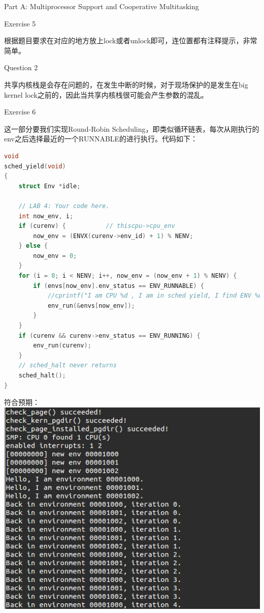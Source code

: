 \documentclass[GBK,winfonts,a4paper,10pt]{ctexart}
\begin{document}
\begin{section}{Part A: Multiprocessor Support and Cooperative Multitasking}
\begin{subsection}{Exercise 5}
\par
根据题目要求在对应的地方放上lock或者unlock即可，连位置都有注释提示，非常简单。
\end{subsection}

\begin{subsection}{Question 2}
\par
共享内核栈是会存在问题的，在发生中断的时候，对于现场保护的是发生在big kernel lock之前的，因此当共享内核栈很可能会产生参数的混乱。
\end{subsection}

\begin{subsection}{Exercise 6}
\par
这一部分要我们实现Round-Robin Scheduling，即类似循环链表，每次从刚执行的env之后选择最近的一个RUNNABLE的进行执行。代码如下：
\begin{lstlisting}[language=C]
void
sched_yield(void)
{
	struct Env *idle;

	// LAB 4: Your code here.
	int now_env, i;
	if (curenv) {			// thiscpu->cpu_env
		now_env = (ENVX(curenv->env_id) + 1) % NENV;
	} else {
		now_env = 0;
	}
	for (i = 0; i < NENV; i++, now_env = (now_env + 1) % NENV) {
		if (envs[now_env].env_status == ENV_RUNNABLE) {
			//cprintf("I am CPU %d , I am in sched yield, I find ENV %d\n", thiscpu->cpu_id, now_env);
			env_run(&envs[now_env]);
		}
	}
	if (curenv && curenv->env_status == ENV_RUNNING) {
		env_run(curenv);
	}
	// sched_halt never returns
	sched_halt();
}
\end{lstlisting}
符合预期：
\includegraphics[scale=0.5]{pic2.png}
\end{subsection}


\end{section}
\end{document}
